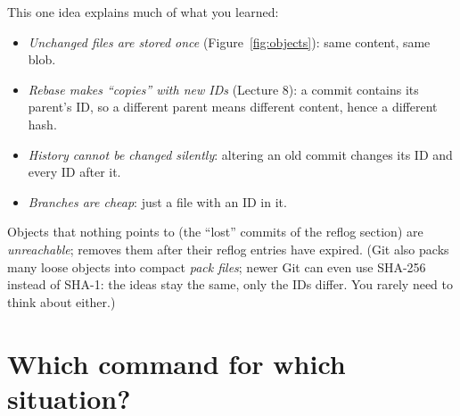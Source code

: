 This one idea explains much of what you learned:
\begin{itemize}
  \item \emph{Unchanged files are stored once} (Figure~\ref{fig:objects}): same content, same blob.
  \item \emph{Rebase makes ``copies'' with new IDs} (Lecture 8): a commit contains its parent's ID, so a different parent means different content, hence a different hash.
  \item \emph{History cannot be changed silently}: altering an old commit changes its ID and every ID after it.
  \item \emph{Branches are cheap}: just a file with an ID in it.
\end{itemize}

Objects that nothing points to (the ``lost'' commits of the reflog section) are \emph{unreachable};  removes them after their reflog entries have expired. (Git also packs many loose objects into compact \emph{pack files}; newer Git can even use SHA-256 instead of SHA-1: the ideas stay the same, only the IDs differ. You rarely need to think about either.)

\section{Which command for which situation?}

